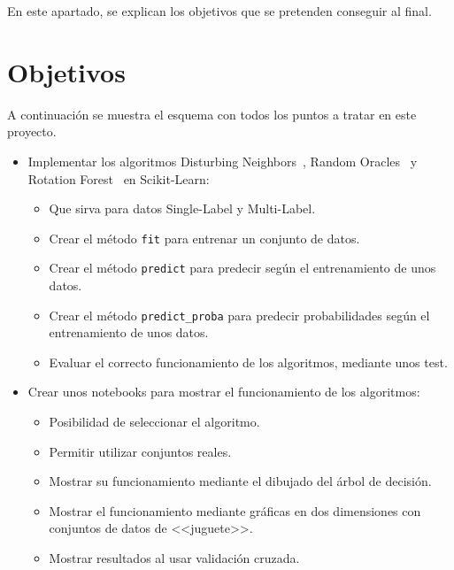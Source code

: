 
En este apartado,  se explican los objetivos que se pretenden conseguir al final.

\section{Objetivos}
A continuación se muestra el esquema con todos los puntos a tratar en este proyecto.
\begin{itemize}
\item Implementar los algoritmos Disturbing Neighbors~\cite{disturbingneighbors}, Random Oracles~\cite{randomoracles} y Rotation Forest~\cite{rotationforest} en Scikit-Learn:
	\begin{itemize}
		\item Que sirva para datos Single-Label y Multi-Label.
		\item Crear el método \texttt{fit} para entrenar un conjunto de datos.
		\item Crear el método \texttt{predict} para predecir según el entrenamiento de unos datos.
		\item Crear el método \texttt{predict\_proba} para predecir probabilidades según el entrenamiento de unos datos.
		\item Evaluar el correcto funcionamiento de los algoritmos, mediante unos test.
	\end{itemize}
	
\item Crear unos notebooks para mostrar el funcionamiento de los algoritmos:
	\begin{itemize}
		\item Posibilidad de seleccionar el algoritmo.
		\item Permitir utilizar conjuntos reales.
		\item Mostrar su funcionamiento mediante el dibujado del árbol de decisión.
		\item Mostrar el funcionamiento mediante gráficas en dos dimensiones con conjuntos de datos de <<juguete>>.
		\item Mostrar resultados al usar validación cruzada.
	\end{itemize}
\end{itemize}

